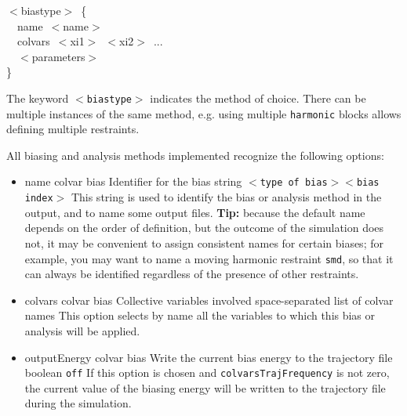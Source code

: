 \begin{cvexampleinput}
\-$<$biastype$>$~\{\\
\-~~name~$<$name$>$ \\
\-~~colvars~$<$xi1$>$~$<$xi2$>$~...\\
\-~~$<$parameters$>$\\
\}
\end{cvexampleinput}

\noindent{}The keyword \texttt{$<$biastype$>$} indicates the method of choice.
There can be multiple instances of the same method, e.g.{} using multiple \texttt{harmonic} blocks allows defining multiple restraints.

All biasing and analysis methods implemented recognize the following options:
\begin{itemize}

\item %
  \keydef
    {name}{%
    colvar bias}{%
    Identifier for the bias}{%
    string}{%
    \texttt{$<$type of bias$><$bias index$>$}}{%
    This string is used to identify the bias or analysis method in the output, and to name some output files.
    \textbf{Tip:} because the default name depends on the order of definition, but the outcome of the simulation does not, it may be convenient to assign consistent names for certain biases; for example, you may want to name a moving harmonic restraint \texttt{smd}, so that it can always be identified regardless of the presence of other restraints.
    }

\item %
  \key
    {colvars}{%
    colvar bias}{%
    Collective variables involved}{%
    space-separated list of colvar names}{%
    This option selects by name all the variables to which this bias or analysis will be applied.}

\item %
  \keydef
    {outputEnergy}{%
    colvar bias}{%
    Write the current bias energy to the trajectory file}{%
    boolean}{%
    \texttt{off}}{%
    If this option is chosen and \texttt{colvarsTrajFrequency} is not zero, the current value of the biasing energy will be written to the trajectory file during the simulation.
}


\end{itemize}
